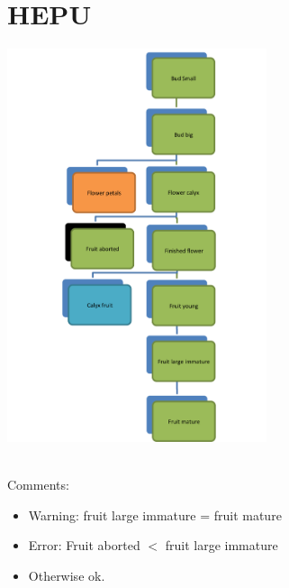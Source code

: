 \documentclass[10pt]{book} %
\begin{document}
\section{HEPU}
\begin{multicols}{2}
\includegraphics[width=3in]{HEPU.png}
\vfill
\columnbreak

\\Comments:
\begin{itemize}
\item Warning: fruit large immature = fruit mature
\item Error: Fruit aborted $<$ fruit large immature
\item Otherwise ok.
\end{itemize}
\end{multicols}

\clearpage
\newpage
\end{document}
